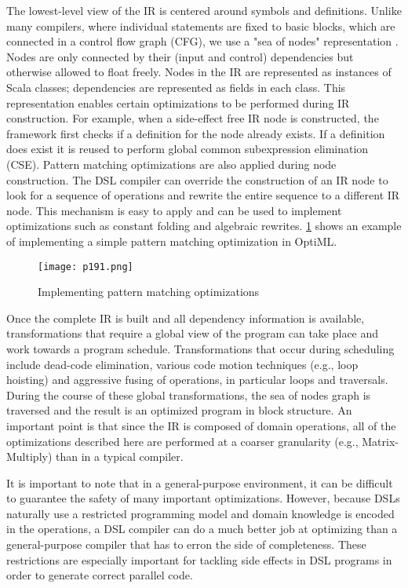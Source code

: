 The lowest-level view of the IR is centered around symbols
and definitions. Unlike many compilers, where individual
statements are fixed to basic blocks, which are connected
in a control flow graph (CFG), we use a "sea of nodes"
representation \cite{paleczny2001java}. Nodes are only connected by their (input
and control) dependencies but otherwise allowed to float freely.
Nodes in the IR are represented as instances of Scala classes;
dependencies are represented as fields in each class. This
representation enables certain optimizations to be performed
during IR construction. For example, when a side-effect free
IR node is constructed, the framework first checks if a definition for the node already exists. If a definition does exist it is
reused to perform global common subexpression elimination
(CSE). Pattern matching optimizations are also applied during
node construction. The DSL compiler can override the construction of an IR node to look for a sequence of operations
and rewrite the entire sequence to a different IR node. This
mechanism is easy to apply and can be used to implement
optimizations such as constant folding and algebraic rewrites.
\ref{fig:p191} shows an example of implementing a simple pattern
matching optimization in OptiML.


\begin{figure}[H]
	\centering
	\texttt{[image: p191.png]}
	\caption{Implementing pattern matching optimizations}
	\label{fig:p191}
\end{figure}

Once the complete IR is built and all dependency information is available, transformations that require a global view
of the program can take place and work towards a program
schedule. Transformations that occur during scheduling include dead-code elimination, various code motion techniques
(e.g., loop hoisting) and aggressive fusing of operations, in
particular loops and traversals. During the course of these
global transformations, the sea of nodes graph is traversed
and the result is an optimized program in block structure.
An important point is that since the IR is composed of
domain operations, all of the optimizations described here are
performed at a coarser granularity (e.g., Matrix-Multiply) than
in a typical compiler.

It is important to note that in a general-purpose environment,
it can be difficult to guarantee the safety of many important optimizations. However, because DSLs naturally use a restricted
programming model and domain knowledge is encoded in
the operations, a DSL compiler can do a much better job at
optimizing than a general-purpose compiler that has to erron the side of completeness. These restrictions are especially
important for tackling side effects in DSL programs in order
to generate correct parallel code.

